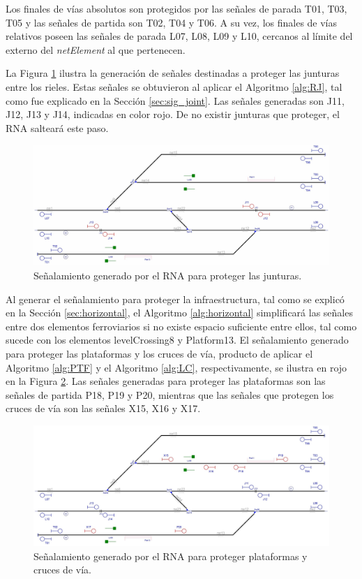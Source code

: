 	Los finales de vías absolutos son protegidos por las señales de parada T01, T03, T05 y las señales de partida son T02, T04 y T06. A su vez, los finales de vías relativos poseen las señales de parada L07, L08, L09 y L10, cercanos al límite del externo del \textit{netElement} al que pertenecen.
	
	La Figura \ref{fig:EJ1_4} ilustra la generación de señales destinadas a proteger las junturas entre los rieles. Estas señales se obtuvieron al aplicar el Algoritmo \ref{alg:RJ}, tal como fue explicado en la Sección \ref{sec:sig_joint}. Las señales generadas son J11, J12, J13 y J14, indicadas en color rojo. De no existir junturas que proteger, el RNA salteará este paso.
	
	\begin{figure}[H]
		\centering
		\includegraphics[width=1\textwidth]{resultados-obtenidos/ejemplo1/images/1_step2.png}
		\centering\caption{Señalamiento generado por el RNA para proteger las junturas.}
		\label{fig:EJ1_4}
	\end{figure}
	
	Al generar el señalamiento para proteger la infraestructura, tal como se explicó en la Sección \ref{sec:horizontal}, el Algoritmo \ref{alg:horizontal} simplificará las señales entre dos elementos ferroviarios si no existe espacio suficiente entre ellos, tal como sucede con los elementos levelCrossing8 y Platform13. El señalamiento generado para proteger las plataformas y los cruces de vía, producto de aplicar el Algoritmo \ref{alg:PTF} y el Algoritmo \ref{alg:LC}, respectivamente, se ilustra en rojo en la Figura \ref{fig:EJ1_5}. Las señales generadas para proteger las plataformas son las señales de partida P18, P19 y P20, mientras que las señales que protegen los cruces de vía son las señales X15, X16 y X17.
		
	\begin{figure}[H]
		\centering
		\includegraphics[width=1\textwidth]{resultados-obtenidos/ejemplo1/images/1_step3.png}
		\centering\caption{Señalamiento generado por el RNA para proteger plataformas y cruces de vía.}
		\label{fig:EJ1_5}
	\end{figure}
	
